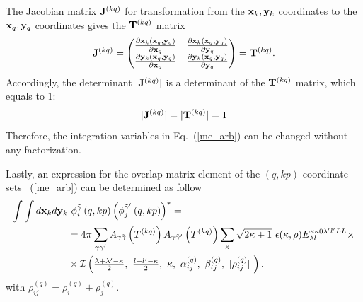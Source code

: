 \documentclass[12pt,a4paper,twoside]{article}
\begin{document}
The Jacobian  matrix ${\bf J}^{(kq)}$ for transformation from the ${\bf x}_k, {\bf y}_k$ coordinates to the ${\bf x}_q, {\bf y}_q$ coordinates gives the ${\bf T}^{(kq)}$ matrix
\begin{equation}
{\bf J}^{(kq)} = 
\begin{pmatrix}
\frac{\partial {\bf x}_k \left({\bf x}_q,{\bf y}_q \right)}{ \partial {\bf x}_q }  
& \frac{\partial {\bf x}_k \left({\bf x}_q,{\bf y}_q \right)}{ \partial {\bf y}_q } \\
\frac{\partial {\bf y}_k \left({\bf x}_q,{\bf y}_q \right)}{ \partial {\bf x}_q }  
& \frac{\partial {\bf y}_k \left({\bf x}_q,{\bf y}_q \right)}{ \partial {\bf y}_q } 
\end{pmatrix} = {\bf T}^{(kq)}.
\end{equation}
Accordingly, the determinant $\vert {\bf J}^{(kq)} \vert$ is a determinant of the ${\bf T}^{(kq)}$ matrix, which equals to $1$:
\begin{equation}
\vert {\bf J}^{(kq)} \vert = \vert {\bf T}^{(kq)} \vert =1
\end{equation}
  Therefore, the integration variables in Eq.~(\ref{me_arb}) can be changed without any factorization. 
  
  Lastly, an expression for the overlap matrix element of the $(q,kp)$ coordinate sets ~(\ref{me_arb}) can be determined as follow
\begin{align}
\int \int d{\bf x}_k d{\bf y}_k & ~\phi_{i}^{\tilde{\gamma}}\left(q,kp \right) \left( \phi_{j}^{\tilde{\gamma}^{\prime}}\left(q,kp \right) \right)^{*}  = \nonumber 
\\ & = 4 \pi \sum_{\tilde{\gamma}\tilde{\gamma}^{\prime}}  A_{\gamma\tilde{\gamma}}\left( T^{(kq)} \right) A_{\gamma\tilde{\gamma}^{\prime}}\left( T^{(kq)} \right)
 \sum_{\kappa} \sqrt{2\kappa+1}~ \epsilon(\kappa, \rho) {E}^{\kappa \kappa 0 \lambda^{\prime} l^{\prime} L L}_{\lambda l} \times  \nonumber \\
 &\times \mathcal{I}\left(
 \tfrac{\tilde{\lambda}+\tilde{\lambda^{\prime}}-\kappa}{2}, ~
 \tfrac{\tilde{l}+\tilde{l^{\prime}}-\kappa}{2},~
 \kappa,~
 \alpha^{(q)}_{ij},~
 \beta^{(q)}_{ij} ,~
 \vert \rho^{(q)}_{ij} \vert ~
  \right).
\end{align}
with $\rho_{ij}^{(q)}=\rho_{i}^{(q)}+\rho_{j}^{(q)}$.
\end{document}
